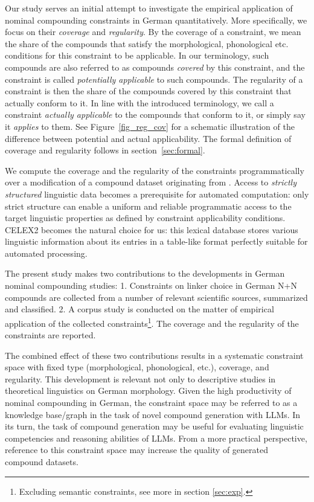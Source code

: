\documentclass[10pt, a4paper]{article}
\begin{document}
Our study serves an initial attempt to investigate the empirical application of nominal compounding constraints in German quantitatively. More specifically, we focus on their \textit{coverage} and \textit{regularity}. By the coverage of a constraint, we mean the share of the compounds that satisfy the morphological, phonological etc. conditions for this constraint to be applicable. In our terminology, such compounds are also referred to as compounds \textit{covered} by this constraint, and the constraint is called \textit{potentially applicable} to such compounds. The regularity of a constraint is then the share of the compounds covered by this constraint that actually conform to it. In line with the introduced terminology, we call a constraint \textit{actually applicable} to the compounds that conform to it, or simply say it \textit{applies} to them. See Figure~\ref{fig_reg_cov} for a schematic illustration of the difference between potential and actual applicability. The formal definition of coverage and regularity follows in section~\ref{sec:formal}.

We compute the coverage and the regularity of the constraints programmatically over a modification of a compound dataset originating from . Access to \textit{strictly structured} linguistic data becomes a prerequisite for automated computation: only strict structure can enable a uniform and reliable programmatic access to the target linguistic properties as defined by constraint applicability conditions. CELEX2  becomes the natural choice for us: this lexical database stores various linguistic information about its entries in a table-like format perfectly suitable for automated processing.

The present study makes two contributions to the developments in German nominal compounding studies: 1. Constraints on linker choice in German N+N compounds are collected from a number of relevant scientific sources, summarized and classified. 2. A corpus study is conducted on the matter of empirical application of the collected constraints\footnote{Excluding semantic constraints, see more in section \ref{sec:exp}.}. The coverage and the regularity of the constraints are reported.

The combined effect of these two contributions results in a systematic constraint space with fixed type (morphological, phonological, etc.), coverage, and regularity. This development is relevant not only to descriptive studies in theoretical linguistics on German morphology. Given the high productivity of nominal compounding in German, the constraint space may be referred to as a knowledge base/graph in the task of novel compound generation with LLMs. In its turn, the task of compound generation may be useful for evaluating linguistic competencies and reasoning abilities of LLMs. From a more practical perspective, reference to this constraint space may increase the quality of generated compound datasets.
\end{document}
